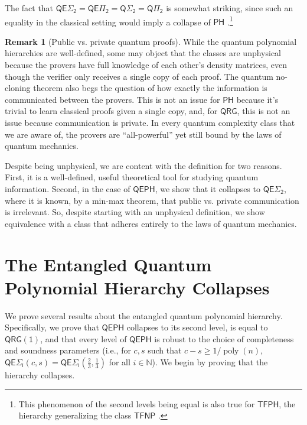 \documentclass[11pt]{article}
\theoremstyle{definition}
\newtheorem{remark}[theorem]{Remark}
\DeclareMathOperator{\poly}{poly}
\newcommand{\nats}{\mathbb N}
\newcommand{\N}{\nats}
\newcommand{\class}[1]{\ensuremath{\mathsf{#1}}\xspace}
\newcommand{\QRG}{\class{QRG}}
\newcommand{\QRGk}[1][k]{\class{QRG(#1)}}
\newcommand{\QRGone}{\QRGk[1]}
\newcommand{\PH}{\class{PH}}
\newcommand{\QSigmai}[1][i]{\class{Q\Sigma_{#1}}}
\newcommand{\QPii}[1][i]{\class{Q\Pi_{#1}}}
\newcommand{\QEPH}{\class{QEPH}}
\newcommand{\entQSigmai}[1][i]{\class{QE\Sigma_{#1}}}
\newcommand{\entQPii}[1][i]{\class{QE\Pi_{#1}}}
\begin{document}
The fact that $\entQSigmai[2] = \entQPii[2] = \QSigmai[2] = \QPii[2]$ is somewhat striking, since such an equality in the classical setting would imply a collapse of $\PH$ \cite[Theorem 5.6]{arora2009computational}.\footnote{This phenomenon of the second levels being equal is also true for $\mathsf{TFPH}$, the hierarchy generalizing the class $\mathsf{TFNP}$ \cite{kleinberg_et_al:LIPIcs.ITCS.2021.44}.} 

\begin{remark}[Public vs. private quantum proofs]\label{remark:public}
While the quantum polynomial hierarchies are well-defined, some may object that the classes are unphysical because the provers have full knowledge of each other's density matrices, 
even though the verifier only receives a single copy of each proof. 
The quantum no-cloning theorem also begs the question of how exactly the information is communicated between the provers. 
This is not an issue for $\PH$ because it's trivial to learn classical proofs given a single copy, and, for $\QRG$, this is not an issue because communication is private. 
In every quantum complexity class that we are aware of, the provers are ``all-powerful'' yet still bound by the laws of quantum mechanics.

Despite being unphysical, we are content with the definition for two reasons. First, it is a well-defined, useful theoretical tool for studying quantum information. 
Second, in the case of $\QEPH$, we show that it collapses to $\entQSigmai[2]$, where it is known, by a min-max theorem, that public vs. private communication is irrelevant. So, despite starting with an unphysical definition, we show equivalence with a class that adheres entirely to the laws of quantum mechanics. 
\end{remark}

\section{The Entangled Quantum Polynomial Hierarchy Collapses}\label{sec:entQPHcollapseInPSPACE}

We prove several results about the entangled quantum polynomial hierarchy. 
Specifically, we prove that $\QEPH$ collapses to its second level, is equal to $\QRGone$, and that every level of $\QEPH$ is robust to the choice of completeness and soundness parameters (i.e., for $c, s$ such that $c-s \geq 1/\poly(n)$, $\entQSigmai(c,s) = \entQSigmai(\frac{2}{3}, \frac{1}{3})$ for all $i \in \N$).
We begin by proving that the hierarchy collapses.
\end{document}
